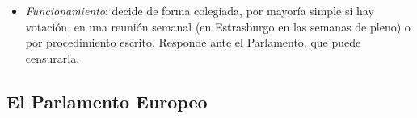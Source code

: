 \documentclass[11pt]{article}
\begin{document}
\begin{itemize}
\begin{itemize}
  \item \emph{Ejecutiva}: ejecuta el presupuesto y gestiona los programas (directamente o con los Estados, en gestión compartida) ; adopta actos delegados y de ejecución, y delega tareas en agencias ejecutivas.
  \item \emph{Guardiana de los Tratados}: abre \emph{procedimientos de infracción} (carta de emplazamiento, dictamen motivado y recurso ante el Tribunal, que puede imponer multas coercitivas; arts. 258-260 TFUE) y aplica directamente la política de competencia y de ayudas de Estado .
  \item \emph{Representación exterior}: salvo en la PESC, representa a la Unión y negocia los acuerdos internacionales, en particular los comerciales, con un mandato del Consejo .
  \end{itemize}
\item \emph{Funcionamiento}: decide de forma colegiada, por mayoría simple si hay votación, en una reunión semanal (en Estrasburgo en las semanas de pleno) o por procedimiento escrito. Responde ante el Parlamento, que puede censurarla.
\end{itemize}

\subsection{El Parlamento Europeo}\label{sec:parlamento}
\end{document}
